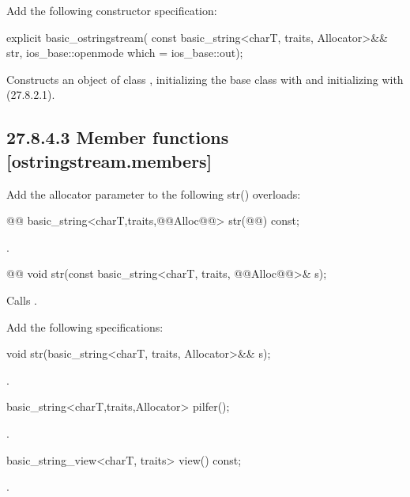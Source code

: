\documentclass[ebook,11pt,article]{memoir}
\begin{document}
Add the following constructor specification:
\begin{insrt}
\begin{itemdecl}
explicit basic_ostringstream(
  const basic_string<charT, traits, Allocator>&& str,
  ios_base::openmode which = ios_base::out);
\end{itemdecl}
\begin{itemdescr}
\pnum
\effects Constructs an object of class , initializing the base class with  and initializing  with  (27.8.2.1).
\end{itemdescr}
\end{insrt}

\subsection{27.8.4.3 Member functions [ostringstream.members]}
Add the allocator parameter to the following str() overloads:
\begin{itemdecl}
@@
basic_string<charT,traits,@@Alloc@@> str(@@) const;
\end{itemdecl}
\begin{itemdescr}
\pnum
\returns
{}.
\end{itemdescr}

\begin{itemdecl}
    @@
    void str(const basic_string<charT, traits, @@Alloc@@>& s);
\end{itemdecl}

\begin{itemdescr}
\pnum
\effects
Calls
.
\end{itemdescr}


Add the following specifications:

\begin{addedblock}
\begin{itemdecl}
void str(basic_string<charT, traits, Allocator>&& s);
\end{itemdecl}
\begin{itemdescr}
\pnum
\effects {}.
\end{itemdescr}
\begin{itemdecl}
basic_string<charT,traits,Allocator> pilfer();
\end{itemdecl}
\begin{itemdescr}
\pnum
\returns {}.
\end{itemdescr}
\begin{itemdecl}
basic_string_view<charT, traits> view() const;
\end{itemdecl}
\begin{itemdescr}
\pnum
\returns {}.
\end{itemdescr}
\end{addedblock}
\end{document}

